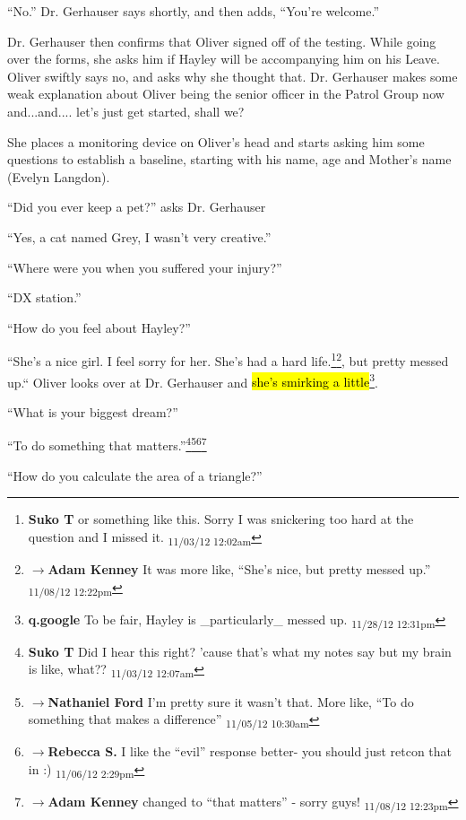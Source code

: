 ``No.''  Dr. Gerhauser says shortly, and then adds, ``You're welcome.''



Dr. Gerhauser then confirms that Oliver signed off of the testing.  While going over the forms, she asks him if Hayley will be accompanying him on his Leave.  Oliver swiftly says no, and asks why she thought that.  Dr. Gerhauser makes some weak explanation about Oliver being the senior officer in the Patrol Group now and...and.... let's just get started, shall we?



She places a monitoring device on Oliver's head and starts asking him some questions to establish a baseline, starting with his name, age and Mother's name (Evelyn Langdon).

``Did you ever keep a pet?'' asks Dr. Gerhauser

``Yes, a cat named Grey, I wasn't very creative.''

``Where were you when you suffered your injury?''

``DX station.''

``How do you feel about Hayley?''

``She's a nice girl.  I feel sorry for her.  She's had a hard life.\footnote{\textbf{Suko T }or something like this.  Sorry I was snickering too hard at the question and I missed it. \textsubscript{11/03/12 12:02am}}\footnote{$\rightarrow$\textbf{Adam Kenney }It was more like, ``She's nice, but pretty messed up.'' \textsubscript{11/08/12 12:22pm}}, but pretty messed up.``  Oliver looks over at Dr. Gerhauser and \hl{she's smirking a little}\footnote{\textbf{q.google }To be fair, Hayley is \_particularly\_ messed up. \textsubscript{11/28/12 12:31pm}}.

``What is your biggest dream?''

``To do something that matters.''\footnote{\textbf{Suko T }Did I hear this right?  'cause that's what my notes say but my brain is like, what?? \textsubscript{11/03/12 12:07am}}\footnote{$\rightarrow$\textbf{Nathaniel Ford }I'm pretty sure it wasn't that. More like, ``To do something that makes a difference'' \textsubscript{11/05/12 10:30am}}\footnote{$\rightarrow$\textbf{Rebecca S. }I like the ``evil'' response better- you should just retcon that in :) \textsubscript{11/06/12 2:29pm}}\footnote{$\rightarrow$\textbf{Adam Kenney }changed to ``that matters'' - sorry guys! \textsubscript{11/08/12 12:23pm}}

``How do you calculate the area of a triangle?''

